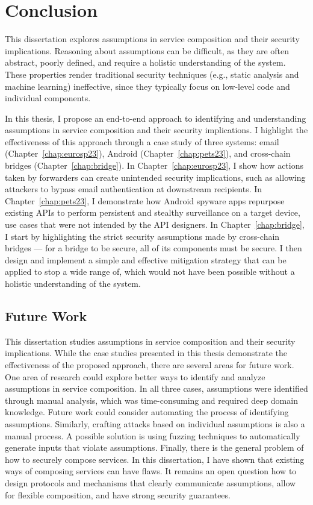 
\chapter{Conclusion}
This dissertation explores assumptions in service composition and their security implications. Reasoning about assumptions can be difficult, as they are often abstract, poorly defined, and require a holistic understanding of the system. These properties render traditional security techniques (e.g., static analysis and machine learning) ineffective, since they typically focus on low-level code and individual components.

In this thesis, I propose an end-to-end approach to identifying and understanding assumptions in service composition and their security implications. I highlight the effectiveness of this approach through a case study of three systems: email (Chapter~\ref{chap:eurosp23}), Android (Chapter~\ref{chap:pets23}), and cross-chain bridges (Chapter~\ref{chap:bridge}). In Chapter~\ref{chap:eurosp23}, I show how actions taken by forwarders can create unintended security implications, such as allowing attackers to bypass email authentication at downstream recipients. In Chapter~\ref{chap:pets23}, I demonstrate how Android spyware apps repurpose existing APIs to perform persistent and stealthy surveillance on a target device, use cases that were not intended by the API designers. In Chapter~\ref{chap:bridge}, I start by highlighting the strict security assumptions made by cross-chain bridges --- for a bridge to be secure, all of its components must be secure. I then design and implement a simple and effective mitigation strategy that can be applied to stop a wide range of, which would not have been possible without a holistic understanding of the system.


\section{Future Work}
This dissertation studies assumptions in service composition and their security implications. While the case studies presented in this thesis demonstrate the effectiveness of the proposed approach, there are several areas for future work. One area of research could explore better ways to identify and analyze assumptions in service composition. In all three cases, assumptions were identified through manual analysis, which was time-consuming and required deep domain knowledge. Future work could consider automating the process of identifying assumptions. Similarly, crafting attacks based on individual assumptions is also a manual process. A possible solution is using fuzzing techniques to automatically generate inputs that violate assumptions. Finally, there is the general problem of how to securely compose services. In this dissertation, I have shown that existing ways of composing services can have flaws. It remains an open question how to design protocols and mechanisms that clearly communicate assumptions, allow for flexible composition, and have strong security guarantees.

